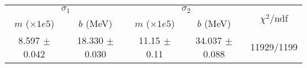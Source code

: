 \begin{tabular}{cc|cc||c}
\multicolumn{2}{c|}{$\sigma_1$} & \multicolumn{2}{|c}{$\sigma_2$} & \multirow{2}{*}{$\chi^2/$ndf} \\
$m$ ($\times1e5$) & $b$ (MeV) & $m$ ($\times1e5$) & $b$ (MeV) & \\
\hline
8.597 $\pm$ 0.042 & 18.330 $\pm$ 0.030 & 11.15 $\pm$ 0.11 & 34.037 $\pm$ 0.088 & 11929/1199\\
\end{tabular}
